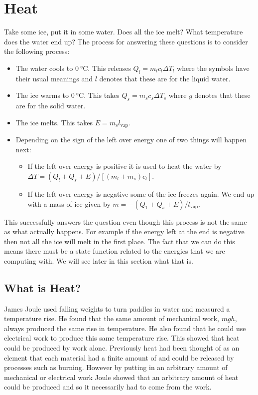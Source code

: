     \section{Heat}
    Take some ice, put it in some water.
    Does all the ice melt?
    What temperature does the water end up?
    The process for answering these questions is to consider the following process:
    \begin{itemize}
        \item The water cools to \(\SI{0}{\degreeCelsius}\).
        This releases \(Q_l = m_lc_l\Delta T_l\) where the symbols have their usual meanings and \(l\) denotes that these are for the liquid water.
        \item The ice warms to \(\SI{0}{\degreeCelsius}\).
        This takes \(Q_s = m_sc_s \Delta T_s\) where \(g\) denotes that these are for the solid water.
        \item The ice melts. This takes \(E = m_s l_\text{vap}\).
        \item Depending on the sign of the left over energy one of two things will happen next:
        \begin{itemize}
            \item If the left over energy is positive it is used to heat the water by \(\Delta T = (Q_l + Q_s + E)/[(m_l + m_s)c_l]\).
            \item If the left over energy is negative some of the ice freezes again.
            We end up with a mass of ice given by \(m = -(Q_1 + Q_s + E)/l_\text{vap}\).
        \end{itemize}
    \end{itemize}
    This successfully answers the question even though this process is not the same as what actually happens.
    For example if the energy left at the end is negative then not all the ice will melt in the first place.
    The fact that we can do this means there must be a state function related to the energies that we are computing with.
    We will see later in this section what that is.
    
    \subsection{What is Heat?}
    James Joule used falling weights to turn paddles in water and measured a temperature rise.
    He found that the same amount of mechanical work, \(mgh\), always produced the same rise in temperature.
    He also found that he could use electrical work to produce this same temperature rise.
    This showed that heat could be produced by work alone.
    Previously heat had been thought of as an element that each material had a finite amount of and could be released by processes such as burning.
    However by putting in an arbitrary amount of mechanical or electrical work Joule showed that an arbitrary amount of heat could be produced and so it necessarily had to come from the work.
    
